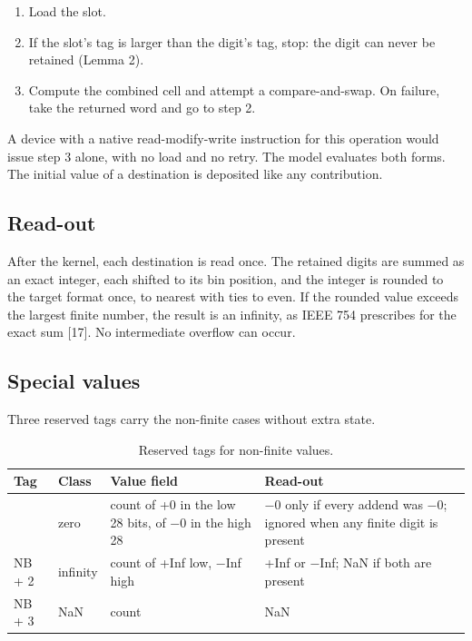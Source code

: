 \documentclass[journal]{IEEEtran}
\begin{document}
\begin{enumerate}
\def\labelenumi{\arabic{enumi}.}
\item
  Load the slot.
\item
  If the slot's tag is larger than the digit's tag, stop: the digit can
  never be retained (Lemma 2).
\item
  Compute the combined cell and attempt a compare-and-swap. On failure,
  take the returned word and go to step 2.
\end{enumerate}

A device with a native read-modify-write instruction for this operation
would issue step 3 alone, with no load and no retry. The model evaluates
both forms. The initial value of a destination is deposited like any
contribution.

\hypertarget{read-out}{%
\subsection{Read-out}\label{read-out}}

After the kernel, each destination is read once. The retained digits are
summed as an exact integer, each shifted to its bin position, and the
integer is rounded to the target format once, to nearest with ties to
even. If the rounded value exceeds the largest finite number, the result
is an infinity, as IEEE 754 prescribes for the exact sum {[}17{]}. No
intermediate overflow can occur.

\hypertarget{special-values}{%
\subsection{Special values}\label{special-values}}

Three reserved tags carry the non-finite cases without extra state.

\begin{table}[!htbp]\centering\small\setlength{\tabcolsep}{4pt}
\caption{Reserved tags for non-finite values.}\label{tab:4}
\begin{tabularx}{\linewidth}{>{\raggedright\arraybackslash\hsize=0.295\hsize}X>{\raggedright\arraybackslash\hsize=0.505\hsize}X>{\raggedright\arraybackslash\hsize=1.600\hsize}X>{\raggedright\arraybackslash\hsize=1.600\hsize}X}
\toprule
Tag & Class & Value field & Read-out \\
\midrule
1 & zero & count of +0 in the low 28 bits, of −0 in the high 28 & −0 only if every addend was −0; ignored when any finite digit is present \\
NB + 2 & infinity & count of +Inf low, −Inf high & +Inf or −Inf; NaN if both are present \\
NB + 3 & NaN & count & NaN \\
\bottomrule
\end{tabularx}
\end{table}
\end{document}
